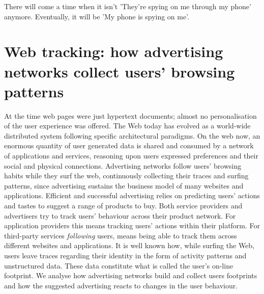 \begin{savequote}[75mm]
There will come a time when it isn't 'They're spying on me through my phone' anymore. Eventually, it will be 'My phone is spying on me'.
\end{savequote}

\chapter{Web tracking: how advertising networks collect users' browsing patterns}

 At the time web pages were just hypertext documents; almost no personalisation of the user experience was offered. The Web today has evolved as a world-wide distributed system following specific architectural paradigms. On the web now, an enormous quantity of user generated data is shared and consumed by a network of applications and services, reasoning upon users expressed preferences and their social and physical connections. Advertising networks follow users' browsing habits while they surf the web, continuously collecting their traces and surfing patterns, since advertising sustains the business model of many websites and applications. Efficient and successful advertising relies on predicting users' actions and tastes to suggest a range of products to buy. Both service providers and advertisers try to track users' behaviour across their product network. For application providers this means tracking users' actions within their platform. For third-party services \emph{following} users, means being able to track them across different websites and applications. It is well known how, while surfing the Web, users leave traces regarding their identity in the form of activity patterns and unstructured data. These data constitute what is called the user's on-line footprint. We analyse how advertising networks build and collect users footprints and how the suggested advertising reacts to changes in the user behaviour.


